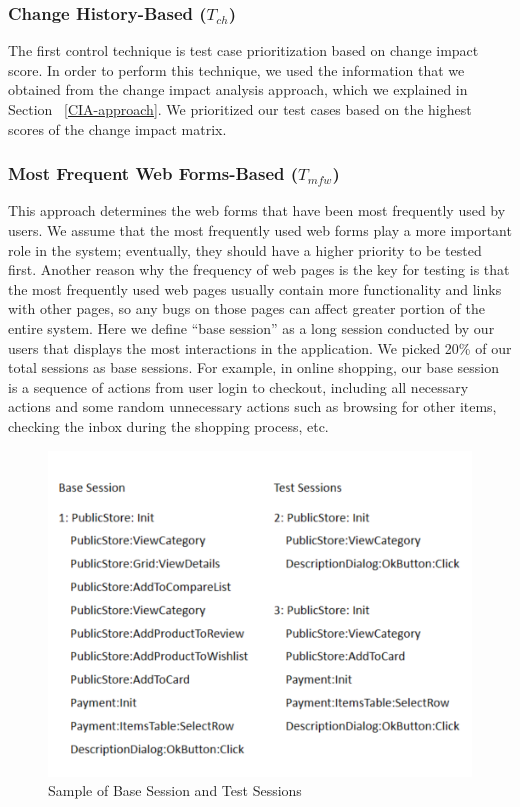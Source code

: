 \subsubsection*{Change History-Based ($T_{ch}$)}
The first control technique is test case prioritization based on change impact
score. In order to perform this technique, we used the information that
we obtained from the change impact analysis approach, which we explained in 
Section ~\ref{CIA-approach}. We prioritized our test cases based on the 
highest scores of the change impact matrix. 
	
\subsubsection*{Most Frequent Web Forms-Based ($T_{mfw}$)}
This approach determines the web forms that have been most frequently used by users. 
We assume that the most frequently used web forms play a more important role in the system; 
eventually, they should have a higher priority to be tested first. Another reason
why the frequency of web pages is the key for testing is that the most frequently used web pages usually 
contain more functionality and links with other pages, so any bugs on 
those pages can affect greater portion of the entire system. 
Here we define ``base session'' as a long session conducted by our users 
that displays the most interactions in the application.
We picked 20\% of our total sessions as base sessions. 
For example, in online shopping, our base session is a sequence of actions
from user login to checkout, including all necessary actions and some 
random unnecessary actions such as browsing for other items, 
checking the inbox during the shopping process, etc. 
	
\begin{figure}[!ht]
	\centering
	\includegraphics[width=0.90\linewidth]{./SessionSample2.png}
	\vspace*{3pt}
	\caption{Sample of Base Session and Test Sessions}
	\label{fig:sessions}
\vspace*{5pt}
\end{figure}
	
